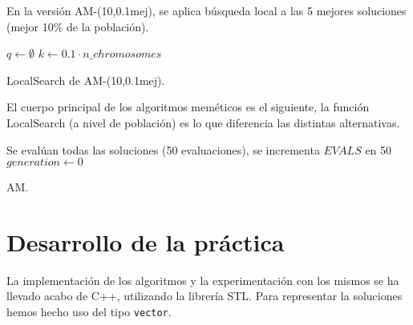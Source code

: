\documentclass{article}
\begin{document}
En la versión AM-(10,0.1mej), se aplica búsqueda local a las 5 mejores soluciones (mejor 10\% de la población).

\begin{algorithm}[H]
	\DontPrintSemicolon %
	$q\gets\emptyset$ 
	$k\gets 0.1\cdot n\_chromosomes$ 
	\caption{{\sc LocalSearch} de AM-(10,0.1mej).}
	\label{alg:am-10-01mej}
\end{algorithm}

El cuerpo principal de los algoritmos meméticos es el siguiente, la función LocalSearch (a nivel de población) es lo que diferencia
las distintas alternativas.

\begin{algorithm}[H]
	\DontPrintSemicolon %
	Se evalúan todas las soluciones (50 evaluaciones), se incrementa $EVALS$ en 50\;
	$generation\gets 0$\;
	\caption{{\sc AM}.}
	\label{alg:am}
\end{algorithm}

\pagebreak

\section{Desarrollo de la práctica}

La implementación de los algoritmos y la experimentación con los mismos se ha llevado acabo de C++, utilizando la librería STL. 
Para representar la soluciones hemos hecho uso del tipo \texttt{vector}.
\end{document}
